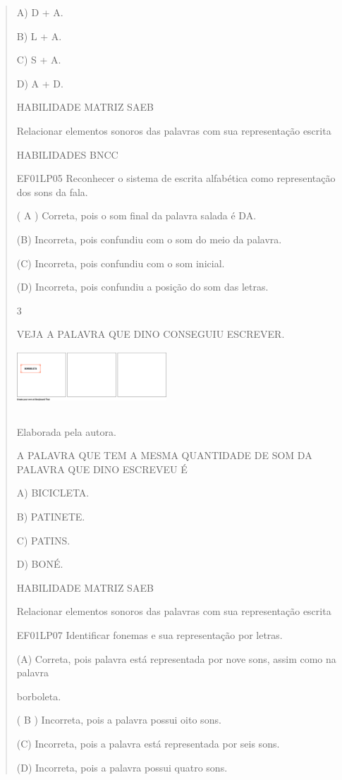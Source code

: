 \begin{escola}
{\begin{verse}
A) D + A.

B) L + A.

C) S + A.

D) A + D.

HABILIDADE MATRIZ SAEB

Relacionar elementos sonoros das palavras com sua representação escrita

HABILIDADES BNCC

EF01LP05 Reconhecer o sistema de escrita alfabética como representação
dos sons da fala.

( A ) Correta, pois o som final da palavra salada é DA.

(B) Incorreta, pois confundiu com o som do meio da palavra.

(C) Incorreta, pois confundiu com o som inicial.

(D) Incorreta, pois confundiu a posição do som das
letras.\protect\hypertarget{_heading=h.ebpkik53igmj}{}{}

\num{3}

VEJA A PALAVRA QUE DINO CONSEGUIU
ESCREVER.\includegraphics[width=2.21250in,height=1.04375in]{media/image243.png}

Elaborada pela autora.

A PALAVRA QUE TEM A MESMA QUANTIDADE DE SOM DA PALAVRA QUE DINO ESCREVEU
É

A) BICICLETA.

B) PATINETE.

C) PATINS.

D) BONÉ.

HABILIDADE MATRIZ SAEB

Relacionar elementos sonoros das palavras com sua representação escrita

EF01LP07 Identificar fonemas e sua representação por letras.

(A) Correta, pois palavra está representada por nove sons, assim como na
palavra

borboleta.

( B ) Incorreta, pois a palavra possui oito sons.

(C) Incorreta, pois a palavra está representada por seis sons.

(D) Incorreta, pois a palavra possui quatro sons.


\end{verse}}
\end{escola}
